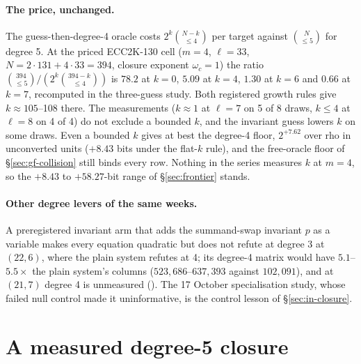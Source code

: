 \paragraph{The price, unchanged.} The guess-then-degree-4 oracle costs
$2^k\binom{N-k}{\le4}$ per target against $\binom{N}{\le5}$ for degree 5.
At the priced ECC2K-130 cell ($m=4$, $\ell=33$, $N=2\cdot131+4\cdot33=394$,
closure exponent $\omega_c=1$) the ratio $\binom{394}{\le5}/(2^k\binom{394-k}{\le4})$ is $78.2$ at
$k=0$, $5.09$ at $k=4$, $1.30$ at $k=6$ and $0.66$ at $k=7$, recomputed in
the three-guess study. Both registered growth rules give $k\approx105$--108
there. The measurements ($k\approx1$ at $\ell=7$ on 5 of 8 draws, $k\le4$
at $\ell=8$ on 4 of 4) do not exclude a bounded $k$, and the invariant guess
lowers $k$ on some draws. Even a bounded $k$ gives at best the degree-4
floor, $2^{+7.62}$ over rho in unconverted units ($+8.43$ bits under the
flat-$k$ rule), and the free-oracle floor of \S\ref{sec:gf-collision} still
binds every row. Nothing in the series measures $k$ at $m=4$, so the $+8.43$
to $+58.27$-bit range of \S\ref{sec:frontier} stands.

\paragraph{Other degree levers of the same weeks.} A preregistered
invariant arm that adds the summand-swap invariant $p$ as a variable makes
every equation quadratic but does not refute at degree 3 at $(22,6)$, where
the plain system refutes at 4; its degree-4 matrix would have $5.1$--$5.5\times$
the plain system's columns ($523{,}686$--$637{,}393$ against $102{,}091$), and at
$(21,7)$ degree 4 is unmeasured
(). The 17 October
specialisation study, whose failed null control made it uninformative, is
the control lesson of \S\ref{sec:in-closure}.

\section{A measured degree-5 closure}\label{sec:bd-degree5}

